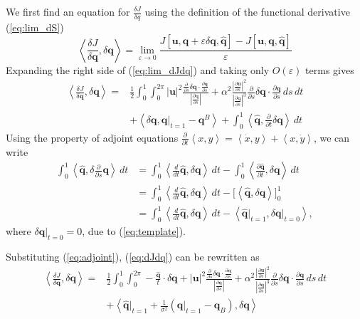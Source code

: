 \documentclass[a4paper, 10pt]{article}
\newcommand{\eq}[1]{(\ref{eq:#1})}
\newcommand{\vect}[1]{\ensuremath{\mathbf{#1}}}
\newcommand{\hvect}[1]{\ensuremath{\hat{\vect{#1}}}}
\newcommand{\pp}[2]{\frac{\partial #1}{\partial #2}}
\newcommand{\vv}[2]{\frac{\delta #1}{\delta #2}}
\newcommand{\angles}[1]{\left\langle #1 \right\rangle}
\newcommand{\eps}{\varepsilon}
\begin{document}
We first find an equation for  $\vv{J}{q}$ using the definition of the functional derivative \eq{lim_dS}
\begin{equation}
  \label{eq:lim_dJdq}
  \left\langle \vv{J}{\vect q}, \delta \vect q \right\rangle =
  \lim_{\eps \rightarrow 0} \frac{J[\vect u, \vect q + \eps \delta \vect q, \hvect q] - J[\vect u, \vect q, \hvect q]}{\eps}
\end{equation}
Expanding the right side of \eq{lim_dJdq} and taking only $O(\eps)$ terms gives
\begin{align}
  \label{eq:dJdq}
  \left\langle \vv{J}{\vect q}, \delta \vect q \right\rangle =&
  \frac{1}{2}\int^1_0\int^{2\pi}_0 |\vect u|^2
  \frac{\pp{}{s}\delta \vect q \cdot \pp{\vect q}{s}}{|\pp{\vect q}{s}|}
    + \alpha^2 \frac{|\pp{\vect u}{s}|^2}{|\pp{\vect q}{s}|^3} \pp{}{s}\delta \vect q \cdot \pp{\vect q}{s} \,ds\,dt  \nonumber \\
    &+ \left\langle \delta \vect q, \vect q\big|_{t=1} - \vect q^B \right\rangle + \int^1_0\left\langle \hvect q, \pp{}{t} \delta \vect q \right\rangle\,dt
\end{align}
Using the property of adjoint equations $\pp{}{t}\angles{x,y} = \angles{\dot x, y} + \angles{x, \dot y}$, we can write
\begin{align}
  \label{eq:adjoint}
  \int^1_0\angles{\hvect q, \delta \pp{}{s} \vect q}\,dt &=  
  \int^1_0\angles{\frac{d}{dt}\hvect q, \delta \vect q}\,dt -  \int^1_0\angles{\pp{\hvect q}{t}, \delta \vect q }\,dt \nonumber \\
  &= \int^1_0\angles{\frac{d}{dt}\hvect q, \delta \vect q}\,dt - \Big[\angles{\hvect q, \delta \vect q}\Big]^1_0 \nonumber \\
  &= \int^1_0\angles{\frac{d}{dt}\hvect q, \delta \vect q}\,dt - \angles{\hvect q\big|_{t=1}, \delta \vect q\big|_{t=0}},
\end{align}
where $\delta \vect q\big|_{t=0} = 0$, due to \eq{template}.

Substituting \eq{adjoint}, \eq{dJdq} can be rewritten as
\begin{align}
  \label{eq:dJdq-adjoint}
  \left\langle \vv{J}{\vect q}, \delta \vect q \right\rangle =&
  \frac{1}{2}\int^1_0\int^{2\pi}_0 -\frac{\hvect q}{t}\cdot \delta \vect q + |\vect u|^2
  \frac{\pp{}{s}\delta \vect q \cdot \pp{\vect q}{s}}{|\pp{\vect q}{s}|}
    + \alpha^2 \frac{|\pp{\vect u}{s}|^2}{|\pp{\vect q}{s}|^3} \pp{}{s}\delta \vect q \cdot \pp{\vect q}{s} \,ds\,dt  \nonumber \\
    &+ \angles{ \hvect q \big|_{t=1} + \frac{1}{\sigma^2}(\vect q \big|_{t=1} - \vect q_B), \delta \vect q}
\end{align}
\end{document}
